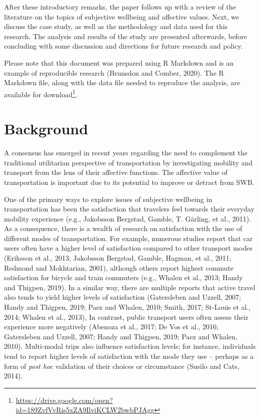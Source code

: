 \documentclass[]{elsarticle} %
\begin{document}
After these introductory remarks, the paper follows up with a review of
the literature on the topics of subjective wellbeing and affective
values. Next, we discuss the case study, as well as the methodology and
data used for this research. The analysis and results of the study are
presented afterwards, before concluding with some discussion and
directions for future research and policy.

Please note that this document was prepared using R Markdown and is an
example of reproducible research (Brunsdon and Comber, 2020). The R
Markdown file, along with the data file needed to reproduce the
analysis, are available for
download\footnote{\url{https://drive.google.com/open?id=189ZvfVvRis5xZA9IlviKCLW2bwbPJAgg}}.

\hypertarget{background}{%
\section{Background}\label{background}}

A consensus has emerged in recent years regarding the need to complement
the traditional utilitarian perspective of transportation by
investigating mobility and transport from the lens of their affective
functions. The affective value of transportation is important due to its
potential to improve or detract from SWB.

One of the primary ways to explore issues of subjective wellbeing in
transportation has been the satisfaction that travelers feel towards
their everyday mobility experience (e.g., Jakobsson Bergstad, Gamble, T.
Gärling, et al., 2011). As a consequence, there is a wealth of research
on satisfaction with the use of different modes of transportation. For
example, numerous studies report that car users often have a higher
level of satisfaction compared to other transport modes (Eriksson et
al., 2013; Jakobsson Bergstad, Gamble, Hagman, et al., 2011; Redmond and
Mokhtarian, 2001), although others report highest commute satisfaction
for bicycle and train commuters (e.g., Whalen et al., 2013; Handy and
Thigpen, 2019). In a similar way, there are multiple reports that active
travel also tends to yield higher levels of satisfaction (Gatersleben
and Uzzell, 2007; Handy and Thigpen, 2019; Paez and Whalen, 2010; Smith,
2017; St-Louis et al., 2014; Whalen et al., 2013), In contrast, public
transport users often assess their experience more negatively (Abenoza
et al., 2017; De Vos et al., 2016; Gatersleben and Uzzell, 2007; Handy
and Thigpen, 2019; Paez and Whalen, 2010). Multi-modal trips also
influence satisfaction levels; for instance, individuals tend to report
higher levels of satisfaction with the mode they use -- perhaps as a
form of \emph{post hoc} validation of their choices or circumstance
(Susilo and Cats, 2014).
\end{document}

